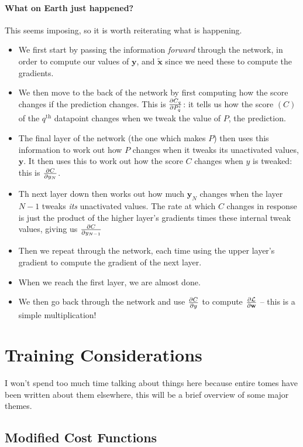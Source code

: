 \documentclass[a4paper,openany,11pt]{book}
\renewcommand\vec[1]{\boldsymbol{\mathbf{#1}}}
\begin{document}
			\subsubsection{What on Earth just happened?}
				This seems imposing, so it is worth reiterating what is happening.
				\begin{itemize}
					\item We first start by passing the information \textit{forward} through the network, in order to compute our values of $\vec{y}$, and $\tilde{\vec{x}}$ since we need these to compute the gradients.
					\item We then move to the back of the network by first computing how the score changes if the prediction changes. This is $\frac{\partial C_q}{\partial P_q^i}$: it tells us how the score $(C)$ of the $q^\text{th}$ datapoint changes when we tweak the value of $P$, the prediction. 
					\item The final layer of the network (the one which makes $P$) then uses this information to work out how $P$ changes when it tweaks its unactivated values, $\vec{y}$. It then uses this to work out how the score $C$ changes when $y$ is tweaked: this is $\frac{\partial C}{\partial y_N}$. 
					\item Th next layer down then works out how much $\vec{y}_N$ changes when the layer $N-1$ tweaks \textit{its} unactivated values. The rate at which $C$ changes in response is just the product of the higher layer's gradients times these internal tweak values, giving us $\frac{\partial C}{\partial y_{N-1}}$
					\item Then we repeat through the network, each time using the upper layer's gradient to compute the gradient of the next layer. 
					\item When we reach the first layer, we are almost done.
					\item We then go back through the network and use $\frac{\partial C}{\partial y}$ to compute $\pdiv{\mathcal{L}}{\vec{w}}$ -- this is a simple multiplication!
				\end{itemize}
		\chapter{Training Considerations}

			I won't spend too much time talking about things here because entire tomes have been written about them elsewhere, this will be a brief overview of some major themes.


			\section{Modified Cost Functions}\label{S:CostFuncs}
\end{document}
